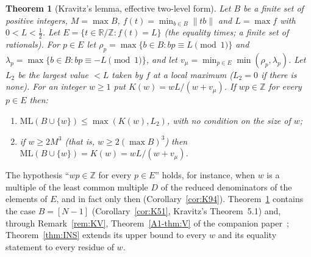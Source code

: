 \documentclass[11pt]{article}
\newtheorem{theorem}{Theorem}[section]
\theoremstyle{definition}
\theoremstyle{remark}
\newcommand{\nd}[1]{\lVert #1\rVert}
\newcommand{\ML}{\mathrm{ML}}
\newcommand{\ZZ}{\mathbb{Z}}
\newcommand{\RR}{\mathbb{R}}
\newcommand{\xA}[1]{\ref{A1-#1}}
\begin{document}
\begin{theorem}[Kravitz's lemma, effective two-level form]\label{thm:K}
Let $B$ be a finite set of positive integers, $M=\max B$, $f(t)=\min_{b\in B}\nd{tb}$ and $L=\max f$ with $0<L<\tfrac12$. Let $E=\{t\in\RR/\ZZ: f(t)=L\}$ (the equality times; a finite set of rationals). For $p\in E$ let $\rho_p=\max\{b\in B: bp\equiv L\pmod 1\}$ and $\lambda_p=\max\{b\in B:bp\equiv-L\pmod 1\}$, and let $v_\mu=\min_{p\in E}\min(\rho_p,\lambda_p)$. Let $L_2$ be the largest value $<L$ taken by $f$ at a local maximum ($L_2=0$ if there is none). For an integer $w\ge1$ put $K(w)=wL/(w+v_\mu)$. If $wp\in\ZZ$ for every $p\in E$ then:
\begin{enumerate}[label=(\alph*),nosep]
\item $\ML(B\cup\{w\})\le\max(K(w),L_2)$, with no condition on the size of $w$;
\item if $w\ge2M^3$ (that is, $w\ge2(\max B)^3$) then $\ML(B\cup\{w\})=K(w)=wL/(w+v_\mu)$.
\end{enumerate}
\end{theorem}
The hypothesis ``$wp\in\ZZ$ for every $p\in E$'' holds, for instance, when $w$ is a multiple of the least common multiple $D$ of the reduced denominators of the elements of $E$, and in fact only then (Corollary~\ref{cor:K94}). Theorem~\ref{thm:K} contains the case $B=[N-1]$ (Corollary~\ref{cor:K51}, Kravitz's Theorem~5.1) and, through Remark~\ref{rem:KV}, Theorem~\xA{thm:V} of the companion paper~\cite{A1}; Theorem~\ref{thm:INS} extends its upper bound to every $w$ and its equality statement to every residue of $w$.
\end{document}
